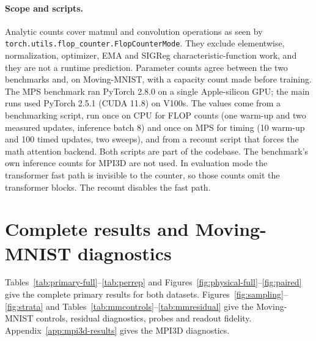 \paragraph{Scope and scripts.} Analytic counts cover matmul and convolution operations as seen by \texttt{torch.utils.flop\_counter.FlopCounterMode}. They exclude elementwise, normalization, optimizer, EMA and SIGReg characteristic-function work, and they are not a runtime prediction. Parameter counts agree between the two benchmarks and, on Moving-MNIST, with a capacity count made before training. The MPS benchmark ran PyTorch 2.8.0 on a single Apple-silicon GPU; the main runs used PyTorch 2.5.1 (CUDA 11.8) on V100s. The values come from a benchmarking script, run once on CPU for FLOP counts (one warm-up and two measured updates, inference batch 8) and once on MPS for timing (10 warm-up and 100 timed updates, two sweeps), and from a recount script that forces the math attention backend. Both scripts are part of the codebase. The benchmark's own inference counts for MPI3D are not used. In evaluation mode the transformer fast path is invisible to the counter, so those counts omit the transformer blocks. The recount disables the fast path.

\FloatBarrier
\section{Complete results and Moving-MNIST diagnostics}
\label{app:results}

Tables~\ref{tab:primary-full}--\ref{tab:perrep} and Figures~\ref{fig:physical-full}--\ref{fig:paired} give the complete primary results for both datasets. Figures~\ref{fig:sampling}--\ref{fig:strata} and Tables~\ref{tab:mmcontrols}--\ref{tab:mmresidual} give the Moving-MNIST controls, residual diagnostics, probes and readout fidelity. Appendix~\ref{app:mpi3d-results} gives the MPI3D diagnostics.

\begin{table}[htbp]
\caption{Primary outcome: physical-forecast Energy Score ($\downarrow$ lower is better), as mean $\pm$ sample SD and range over five training replications. Bold marks the lowest mean per dataset, which by itself does not establish superiority (see Table~\ref{tab:paired}). The datasets have different units. Appendix Table~\ref{tab:perrep} lists all 40 values.}
\label{tab:primary-full}
\centering
\small

\end{table}

\begin{table}[htbp]
\caption{Prespecified paired contrasts ($\downarrow$ negative values favour \shvar{}). Intervals are individual paired-$t$ intervals (df $=4$), not simultaneous, and no hypothesis tests were prespecified. ``Runs $<0$'' counts the replications in which \shvar{} scored lower.}
\label{tab:paired}
\centering
\small

\end{table}

